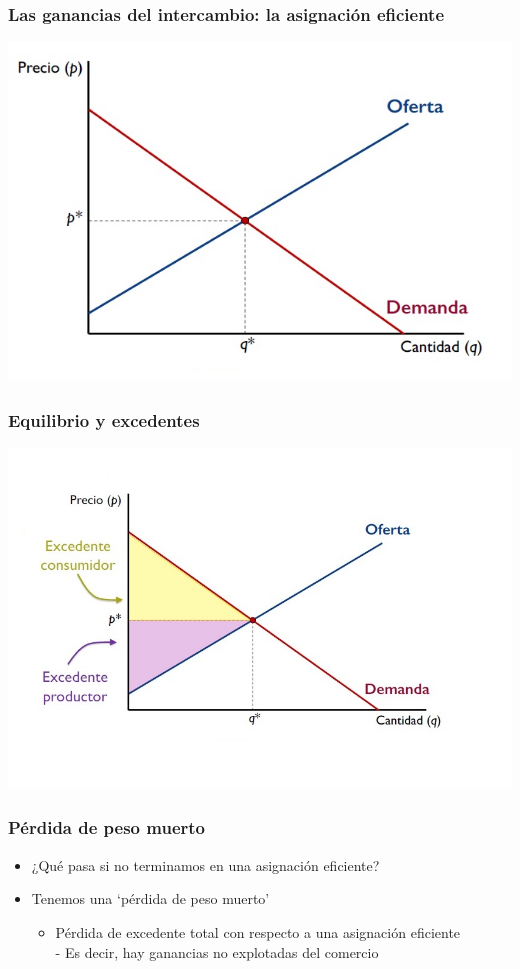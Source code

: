 \documentclass{beamer}
\begin{document}
\begin{frame}
\frametitle{ Las ganancias del intercambio: la asignación eficiente}
\includegraphics[scale=0.55]{Figures/Tema_07.3_equilibrioofertademanda_0.jpg}
\end{frame} 

\begin{frame}
\frametitle{ Equilibrio y excedentes}
\begin{center}
\includegraphics[scale=0.5]{Figures/Tema_07.23_newexcedentes.jpg}
\end{center}
\end{frame}

\begin{frame}
\frametitle{ Pérdida de peso muerto}
\begin{itemize}
    \item ¿Qué pasa si no terminamos en una asignación eficiente? 
    \item Tenemos una ‘pérdida de peso muerto’
    \begin{itemize}
        \item Pérdida de excedente total con respecto a una asignación eficiente \\
        - Es decir, hay ganancias no explotadas del comercio
    \end{itemize}
    \end{itemize}
\end{frame}
\end{document}
